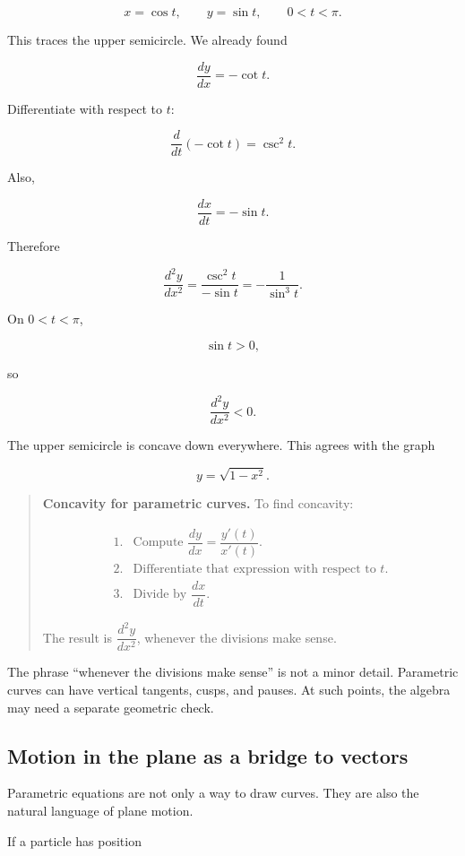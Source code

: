 \[
x=\cos t,
\qquad
y=\sin t,
\qquad
0<t<\pi.
\]

This traces the upper semicircle.  We already found

\[
\frac{dy}{dx}=-\cot t.
\]

Differentiate with respect to \(t\):

\[
\frac{d}{dt}(-\cot t)=\csc^2 t.
\]

Also,

\[
\frac{dx}{dt}=-\sin t.
\]

Therefore

\[
\frac{d^2y}{dx^2}
=
\frac{\csc^2 t}{-\sin t}
=
-\frac{1}{\sin^3 t}.
\]

On \(0<t<\pi\),

\[
\sin t>0,
\]

so

\[
\frac{d^2y}{dx^2}<0.
\]

The upper semicircle is concave down everywhere.  This agrees with the graph

\[
y=\sqrt{1-x^2}.
\]

\begin{quote}
\textbf{Concavity for parametric curves.}
To find concavity:

\[
\begin{array}{ll}
\text{1.} & \text{Compute } \dfrac{dy}{dx}=\dfrac{y'(t)}{x'(t)}.\\[8pt]
\text{2.} & \text{Differentiate that expression with respect to \(t\).}\\[8pt]
\text{3.} & \text{Divide by } \dfrac{dx}{dt}.
\end{array}
\]

The result is \(\dfrac{d^2y}{dx^2}\), whenever the divisions make sense.
\end{quote}

The phrase ``whenever the divisions make sense'' is not a minor detail.  Parametric
curves can have vertical tangents, cusps, and pauses.  At such points, the algebra may
need a separate geometric check.

\subsection{Motion in the plane as a bridge to vectors}
\label{subsec:motion-plane-bridge-vectors}

Parametric equations are not only a way to draw curves.  They are also the natural
language of plane motion.

If a particle has position

